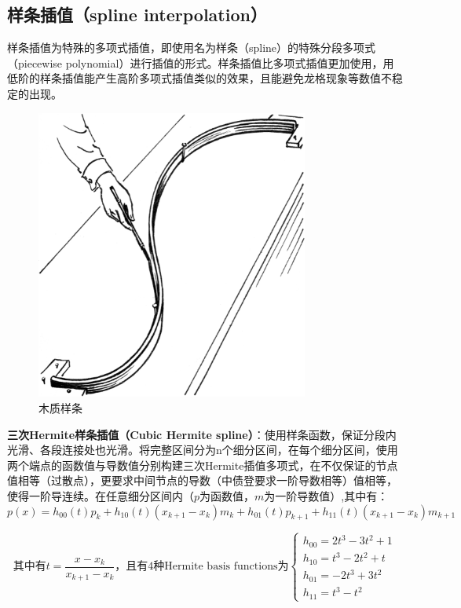 \documentclass[11pt]{article}
\begin{document}
\subsection*{样条插值（spline interpolation）}

样条插值为特殊的多项式插值，即使用名为样条（spline）的特殊分段多项式（piecewise polynomial）进行插值的形式。样条插值比多项式插值更加使用，用低阶的样条插值能产生高阶多项式插值类似的效果，且能避免龙格现象等数值不稳定的出现。

\begin{figure}[H]
    \centering
    \includegraphics[width=0.8\textwidth]{fig/spline.png}
	\caption{木质样条}
    \label{fig:spline}
\end{figure}

\textbf{三次Hermite样条插值（Cubic Hermite spline）}：使用样条函数，保证分段内光滑、各段连接处也光滑。将完整区间分为n个细分区间，在每个细分区间，使用两个端点的函数值与导数值分别构建三次Hermite插值多项式，在不仅保证的节点值相等（过散点），更要求中间节点的导数（中债登要求一阶导数相等）值相等，使得一阶导连续。在任意细分区间内（$p$为函数值，$m$为一阶导数值）,其中有：
\begin{equation*}
	p(x) = h_{00}(t) p_k + h_{10}(t)(x_{k+1} - x_k)m_k + h_{01}(t)p_{k+1} + h_{11}(t)(x_{k+1}-x_k) m_{k+1}
\end{equation*}

\begin{equation*}
	\text{其中有}
	t=\frac{x-x_k}{x_{k+1}-x_k} \text{，且有4种Hermite basis functions为}
	\begin{cases}
		h_{00} = 2t^3 - 3t^2 +1 \\
		h_{10} = t^3 - 2t^2 + t \\
		h_{01} = -2t^3 + 3t^2\\
		h_{11} = t^3 -t^2
	\end{cases}
\end{equation*}
\end{document}
